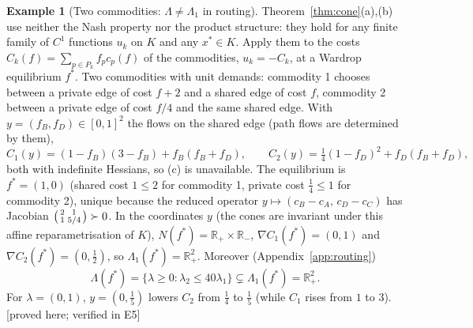 \documentclass[11pt,a4paper]{article}
\theoremstyle{plain}
\theoremstyle{definition}
\newtheorem{example}[theorem]{Example}
\theoremstyle{remark}
\newcommand{\R}{\mathbb{R}}
\newcommand{\NC}{N}
\newcommand{\status}[1]{\textsf{\small [#1]}}
\newcommand{\Lam}{\Lambda}
\newcommand{\Lone}{\Lambda_{1}}
\begin{document}
\begin{example}[Two commodities: $\Lam\ne\Lone$ in routing]\label{ex:routing}
Theorem~\ref{thm:cone}(a),(b) use neither the Nash property nor the product structure: they hold for any finite family of $C^1$ functions $u_k$ on $K$ and any $x^*\in K$. Apply them to the costs $C_k(f)=\sum_{p\in P_k}f_pc_p(f)$ of the commodities, $u_k=-C_k$, at a Wardrop equilibrium $f^*$. Two commodities with unit demands: commodity 1 chooses between a private edge of cost $f+2$ and a shared edge of cost $f$, commodity 2 between a private edge of cost $f/4$ and the same shared edge. With $y=(f_B,f_D)\in[0,1]^2$ the flows on the shared edge (path flows are determined by them),
\[
C_1(y)=(1-f_B)(3-f_B)+f_B(f_B+f_D),\qquad C_2(y)=\tfrac14(1-f_D)^2+f_D(f_B+f_D),
\]
both with indefinite Hessians, so (c) is unavailable. The equilibrium is $f^*=(1,0)$ (shared cost $1\le 2$ for commodity 1, private cost $\tfrac14\le 1$ for commodity 2), unique because the reduced operator $y\mapsto(c_B-c_A,\,c_D-c_C)$ has Jacobian $\begin{psmallmatrix}2&1\\1&5/4\end{psmallmatrix}\succ 0$. In the coordinates $y$ (the cones are invariant under this affine reparametrisation of $K$), $\NC(f^*)=\R_+\times\R_-$, $\nabla C_1(f^*)=(0,1)$ and $\nabla C_2(f^*)=(0,\tfrac12)$, so $\Lone(f^*)=\R^2_+$. Moreover (Appendix~\ref{app:routing})
\[
\Lam(f^*)=\{\lambda\ge 0:\lambda_2\le 40\lambda_1\}\subsetneq\Lone(f^*)=\R^2_+ .
\]
For $\lambda=(0,1)$, $y=(0,\tfrac15)$ lowers $C_2$ from $\tfrac14$ to $\tfrac15$ (while $C_1$ rises from $1$ to $3$). \status{proved here; verified in E5}
\end{example}
\end{document}
